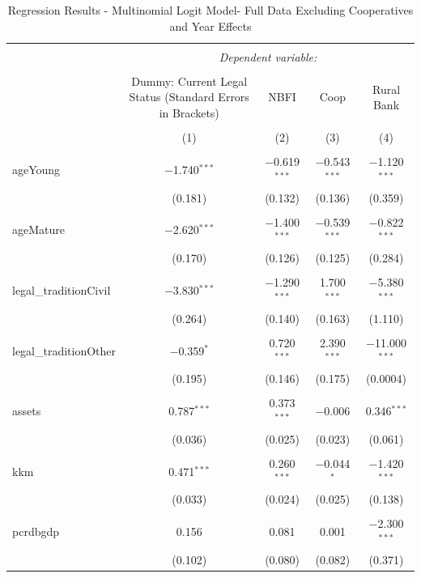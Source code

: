 \documentclass[a4paper,nobind]{templates/ociamthesis}
\begin{document}
\begin{table}[!htbp] \centering 
  \caption{Regression Results - Multinomial Logit Model- Full Data Excluding Cooperatives and Year Effects} 
  \label{} 
\footnotesize 
\begin{tabular}{@{\extracolsep{5pt}}lcccc} 
\\[-1.8ex]\hline 
\hline \\[-1.8ex] 
 & \multicolumn{4}{c}{\textit{Dependent variable:}} \\ 
\cline{2-5} 
\\[-1.8ex] & Dummy: Current Legal Status (Standard Errors in Brackets) & NBFI & Coop & Rural Bank \\ 
\\[-1.8ex] & (1) & (2) & (3) & (4)\\ 
\hline \\[-1.8ex] 
 ageYoung & $-$1.740$^{***}$ & $-$0.619$^{***}$ & $-$0.543$^{***}$ & $-$1.120$^{***}$ \\ 
  & (0.181) & (0.132) & (0.136) & (0.359) \\ 
  & & & & \\ 
 ageMature & $-$2.620$^{***}$ & $-$1.400$^{***}$ & $-$0.539$^{***}$ & $-$0.822$^{***}$ \\ 
  & (0.170) & (0.126) & (0.125) & (0.284) \\ 
  & & & & \\ 
 legal\_traditionCivil & $-$3.830$^{***}$ & $-$1.290$^{***}$ & 1.700$^{***}$ & $-$5.380$^{***}$ \\ 
  & (0.264) & (0.140) & (0.163) & (1.110) \\ 
  & & & & \\ 
 legal\_traditionOther & $-$0.359$^{*}$ & 0.720$^{***}$ & 2.390$^{***}$ & $-$11.000$^{***}$ \\ 
  & (0.195) & (0.146) & (0.175) & (0.0004) \\ 
  & & & & \\ 
 assets & 0.787$^{***}$ & 0.373$^{***}$ & $-$0.006 & 0.346$^{***}$ \\ 
  & (0.036) & (0.025) & (0.023) & (0.061) \\ 
  & & & & \\ 
 kkm & 0.471$^{***}$ & 0.260$^{***}$ & $-$0.044$^{*}$ & $-$1.420$^{***}$ \\ 
  & (0.033) & (0.024) & (0.025) & (0.138) \\ 
  & & & & \\ 
 pcrdbgdp & 0.156 & 0.081 & 0.001 & $-$2.300$^{***}$ \\ 
  & (0.102) & (0.080) & (0.082) & (0.371) \\ 

\end{tabular}
\end{table}
\end{document}
